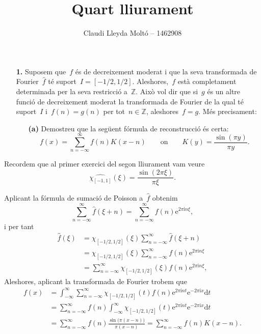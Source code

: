 \documentclass[a4paper]{article}
\title{Quart lliurament}
\author{Claudi Lleyda Moltó -- 1462908}
\theoremstyle{plain}
\theoremstyle{definition}
\newcommand{\iu}{\mathrm{i}}
\newcommand{\e}{\mathrm{e}}
\providecommand{\uppi}{\pi}
\newcommand{\diff}{\mathrm{d}}
\newcommand{\ZZ}{\mathbb{Z}}
\begin{document}
\maketitle

\begin{enumerate}
    \item[\textbf{1.}] Suposem que~\(f\) és de decreixement moderat i que la
        seva transformada de Fourier~\(\widehat{f}\) té suport~\(I=[-1/2,1/2]\).
        Aleshores,~\(f\) està completament determinada per la seva restricció
        a~\(\ZZ\).
        Això vol dir que si~\(g\) és un altre funció de decreixement moderat la
        transformada de Fourier de la qual té suport~\(I\) i~\(f(n)=g(n)\) per
        tot~\(n\in\ZZ\), aleshores~\(f=g\).
        Més precisament:
        \begin{enumerate}
            \item[\textbf{(a)}] Demostreu que la següent fórmula de reconstrucció
                és certa:
                \[
                    f(x) = \sum_{n=-\infty}^{\infty} f(n) K(x-n)
                    \qquad\text{on}\qquad
                    K(y) = \frac{\sin(\uppi y)}{\uppi y}.
                \]
        \end{enumerate}
\end{enumerate}

Recordem que al primer exercici del segon lliurament vam veure
\[
    \widehat{\chi_{[-1,1]}}(\xi) = \frac{\sin(2\uppi \xi)}{\uppi \xi}.
\]

Aplicant la fórmula de sumació de Poisson a~\(\widehat{f}\) obtenim
\[
    \sum_{n=-\infty}^{\infty}
    \widehat{f}(\xi+n)
    =
    \sum_{n=-\infty}^{\infty}
    f(n)\e^{2\uppi\iu n\xi},
\]
i per tant
\begin{align*}
    \widehat{f}(\xi) &= \chi_{[-1/2,1/2]}(\xi)
                      \sum_{n=-\infty}^{\infty}
                      \widehat{f}(\xi+n) \\
                   &= \chi_{[-1/2,1/2]}(\xi)
                      \sum_{n=-\infty}^{\infty}
                      f(n)
                      \e^{2\uppi\iu n\xi} \\
                   &= \sum_{n=-\infty}^{\infty}
                      \chi_{[-1/2,1/2]}(\xi)
                      f(n)
                      \e^{2\uppi\iu n\xi},
\end{align*}
Aleshores, aplicant la transformada de Fourier trobem que
\begin{align*}
    f(x) &= \int_{-\infty}^{\infty}
            \sum_{n=-\infty}^{\infty}
            \chi_{[-1/2,1/2]}(t)
            f(n)
            \e^{2\uppi\iu nt}
            \e^{-2\uppi\iu x}
            \diff t \\
         &= \sum_{n=-\infty}^{\infty}
            f(n)
            \int_{-\infty}^{\infty}
            \chi_{[-1/2,1/2]}(t)
            \e^{2\uppi\iu nt}
            \e^{-2\uppi\iu x}
            \diff t \\
         &= \sum_{n=-\infty}^{\infty}
            f(n)
            \frac{\sin\bigl(\uppi(x-n)\bigr)}{\uppi(x-n)}
          = \sum_{n=-\infty}^{\infty}
            f(n)
            K(x-n).
\end{align*}
\end{document}
